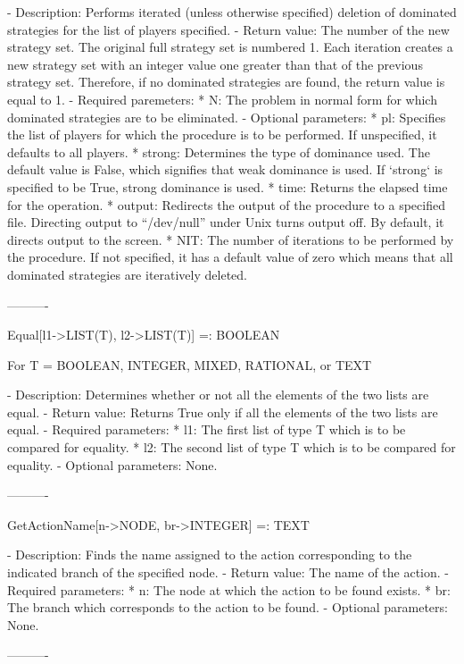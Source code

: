 {   -	Description:  Performs iterated (unless otherwise specified) deletion 
	of dominated strategies for the list of players specified.  
   -	Return value:  The number of the new strategy set.  The original full
	strategy set is numbered 1.  Each iteration creates a new strategy set
	with an integer value one greater than that of the previous strategy 
	set.  Therefore, if no dominated strategies are found, the return value
	is equal to 1.
   -	Required paremeters:
	  *  N:  The problem in normal form for which dominated strategies are
		to be eliminated.
   -	Optional parameters:
	  *  pl:  Specifies the list of players for which the procedure is to
		be performed.  If unspecified, it defaults to all players. 
 	  *  strong:  Determines the type of dominance used.  The default value
		is False, which signifies that weak dominance is used.  If 
		`strong` is specified to be True, strong dominance is used.  
	  *  time:  Returns the elapsed time for the operation.
	  *  output:  Redirects the output of the procedure to a specified 
		file.  Directing output to ``/dev/null'' under Unix turns 
		output off.  By default, it directs output to the screen.
	  *  NIT:  The number of iterations to be performed by the procedure.
		If not specified, it has a default value of zero which means 
		that all dominated strategies are iteratively deleted.

----------

Equal[l1->LIST(T), l2->LIST(T)] =: BOOLEAN

	For T = BOOLEAN, INTEGER, MIXED, RATIONAL, or TEXT

   -	Description:  Determines whether or not all the elements of the two
	lists are equal.
   -	Return value:  Returns True only if all the elements of the two lists
	are equal.
   -	Required parameters:  
	  *  l1:  The first list of type T which is to be compared for 
		equality.
	  *  l2:  The second list of type T which is to be compared for 
		equality.
   -	Optional parameters:  None.

----------

GetActionName[n->NODE, br->INTEGER] =: TEXT

   -	Description:  Finds the name assigned to the action corresponding to 
	the indicated branch of the specified node.
   -	Return value:  The name of the action.
   -	Required parameters:
	  *  n:  The node at which the action to be found exists.
	  *  br:  The branch which corresponds to the action to be found.
   -	Optional parameters:  None.

----------

}
